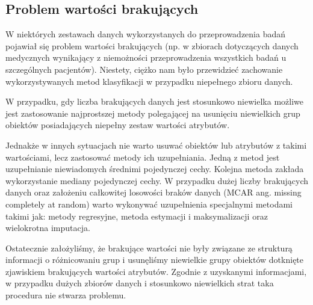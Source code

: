 \documentclass[11pt, a4paper, titlepage]{report}
\begin{document}

\subsection{Problem wartości brakujących}
W niektórych zestawach danych wykorzystanych do przeprowadzenia badań pojawiał się problem wartości brakujących (np. w zbiorach dotyczących danych medycznych wynikający z niemożności przeprowadzenia wszystkich badań u szczególnych pacjentów). Niestety, ciężko nam było przewidzieć zachowanie wykorzystywanych metod klasyfikacji w przypadku niepełnego zbioru danych. 

W przypadku, gdy liczba brakujących danych jest stosunkowo niewielka możliwe jest zastosowanie najprostszej metody polegającej na usunięciu niewielkich grup obiektów posiadających niepełny zestaw wartości atrybutów. 

Jednakże w innych sytuacjach nie warto usuwać obiektów lub atrybutów z takimi wartościami, lecz zastosować metody ich uzupełniania. Jedną z metod jest uzupełnianie niewiadomych średnimi pojedynczej cechy. Kolejna metoda zakłada wykorzystanie mediany pojedynczej cechy. W przypadku dużej liczby brakujących danych oraz założeniu całkowitej losowości braków danych (MCAR ang. missing completely at random) warto wykonywać uzupełnienia specjalnymi metodami takimi jak: metody regresyjne, metoda estymacji i maksymalizacji oraz wielokrotna imputacja.

Ostatecznie założyliśmy, że brakujące wartości nie były związane ze strukturą informacji o różnicowaniu grup i usunęliśmy niewielkie grupy obiektów dotknięte zjawiskiem brakujących wartości atrybutów.
Zgodnie z uzyskanymi informacjami, w przypadku dużych zbiorów danych i stosunkowo niewielkich strat taka procedura nie stwarza problemu.
\end{document}
